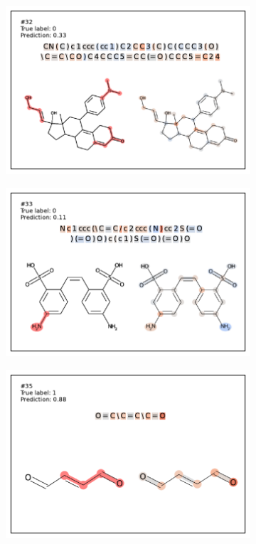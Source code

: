 \begin{figure}
\begin{subfigure}[b]{0.33\textwidth}
  \includegraphics[width=\textwidth]{figures/ames/ames32.pdf} 
\end{subfigure} 
\begin{subfigure}[b]{0.33\textwidth} 
  \centering 
  \includegraphics[width=\textwidth]{figures/ames/ames33.pdf} 
\end{subfigure}\begin{subfigure}[b]{0.33\textwidth} 
  \centering 
  \includegraphics[width=\textwidth]{figures/ames/ames35.pdf} 

\end{subfigure}
\end{figure}
